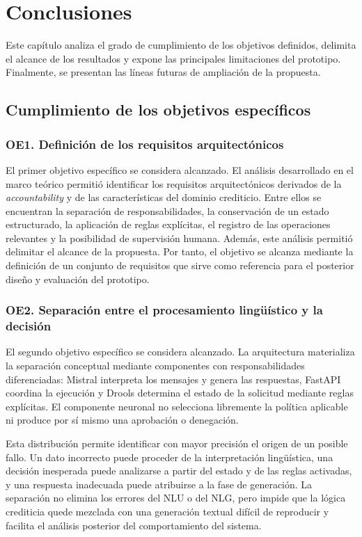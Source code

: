 \documentclass[12pt,a4paper]{report}
\begin{document}
\fussy

\chapter{Conclusiones}

Este capítulo analiza el grado de cumplimiento de los objetivos definidos, delimita el alcance de los resultados y expone las principales limitaciones del prototipo. Finalmente, se presentan las líneas futuras de ampliación de la propuesta.

\section{Cumplimiento de los objetivos específicos}

\subsection{OE1. Definición de los requisitos arquitectónicos}

El primer objetivo específico se considera alcanzado. El análisis desarrollado en el marco teórico permitió identificar los requisitos arquitectónicos derivados de la \textit{accountability} y de las características del dominio crediticio. Entre ellos se encuentran la separación de responsabilidades, la conservación de un estado estructurado, la aplicación de reglas explícitas, el registro de las operaciones relevantes y la posibilidad de supervisión humana. Además, este análisis permitió delimitar el alcance de la propuesta. Por tanto, el objetivo se alcanza mediante la definición de un conjunto de requisitos que sirve como referencia para el posterior diseño y evaluación del prototipo.

\subsection{OE2. Separación entre el procesamiento lingüístico y la decisión}

El segundo objetivo específico se considera alcanzado. La arquitectura materializa la separación conceptual mediante componentes con responsabilidades diferenciadas: Mistral interpreta los mensajes y genera las respuestas, FastAPI coordina la ejecución y Drools determina el estado de la solicitud mediante reglas explícitas. El componente neuronal no selecciona libremente la política aplicable ni produce por sí mismo una aprobación o denegación.

Esta distribución permite identificar con mayor precisión el origen de un posible fallo. Un dato incorrecto puede proceder de la interpretación lingüística, una decisión inesperada puede analizarse a partir del estado y de las reglas activadas, y una respuesta inadecuada puede atribuirse a la fase de generación. La separación no elimina los errores del NLU o del NLG, pero impide que la lógica crediticia quede mezclada con una generación textual difícil de reproducir y facilita el análisis posterior del comportamiento del sistema.
\end{document}

